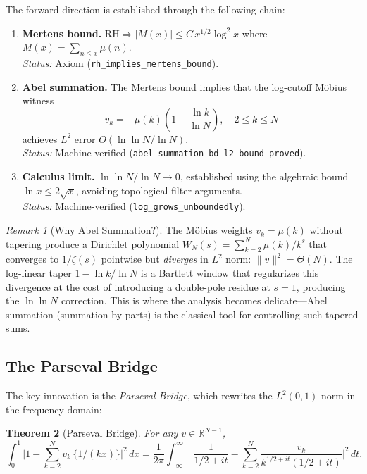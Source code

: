 \documentclass[11pt,a4paper]{article}
\theoremstyle{plain}
\newtheorem{theorem}{Theorem}[section]
\theoremstyle{definition}
\theoremstyle{remark}
\newtheorem{remark}[theorem]{Remark}
\newcommand{\RH}{\mathrm{RH}}
\newcommand{\RR}{\mathbb{R}}
\newcommand{\fract}[1]{\{#1\}}
\newcommand{\lean}[1]{\texttt{#1}}
\begin{document}
The forward direction is established through the following chain:

\begin{enumerate}
  \item \textbf{Mertens bound.} $\RH \Rightarrow |M(x)| \leq C\,x^{1/2}\log^2 x$
    where $M(x) = \sum_{n \leq x} \mu(n)$. \\
    \emph{Status:} Axiom (\lean{rh\_implies\_mertens\_bound}).

  \item \textbf{Abel summation.} The Mertens bound implies that the
    log-cutoff M\"obius witness
    \[
      v_k = -\mu(k)\left(1 - \frac{\ln k}{\ln N}\right), \quad 2 \leq k \leq N
    \]
    achieves $L^2$ error $O(\ln\ln N / \ln N)$. \\
    \emph{Status:} Machine-verified (\lean{abel\_summation\_bd\_l2\_bound\_proved}).

  \item \textbf{Calculus limit.} $\ln\ln N / \ln N \to 0$, established
    using the algebraic bound $\ln x \leq 2\sqrt{x}$, avoiding
    topological filter arguments. \\
    \emph{Status:} Machine-verified (\lean{log\_grows\_unboundedly}).
\end{enumerate}

\begin{remark}[Why Abel Summation?]
The M\"obius weights $v_k = \mu(k)$ without tapering produce a Dirichlet
polynomial $W_N(s) = \sum_{k=2}^N \mu(k)/k^s$ that converges to $1/\zeta(s)$
pointwise but \emph{diverges} in $L^2$ norm: $\|v\|^2 = \Theta(N)$. The
log-linear taper $1 - \ln k / \ln N$ is a Bartlett window that regularizes
this divergence at the cost of introducing a double-pole residue at $s = 1$,
producing the $\ln\ln N$ correction. This is where the analysis becomes
delicate---Abel summation (summation by parts) is the classical tool for
controlling such tapered sums.
\end{remark}

\subsection{The Parseval Bridge}

The key innovation is the \emph{Parseval Bridge}, which rewrites the
$L^2(0,1)$ norm in the frequency domain:

\begin{theorem}[Parseval Bridge]
\label{thm:parseval}
For any $v \in \RR^{N-1}$,
\[
  \int_0^1 \biggl|1 - \sum_{k=2}^N v_k\,\fract{1/(kx)}\biggr|^2\,dx
  = \frac{1}{2\pi} \int_{-\infty}^{\infty}
    \biggl|\frac{1}{1/2+it} - \sum_{k=2}^N \frac{v_k}{k^{1/2+it}(1/2+it)}\biggr|^2\,dt.
\]
\end{theorem}
\end{document}
